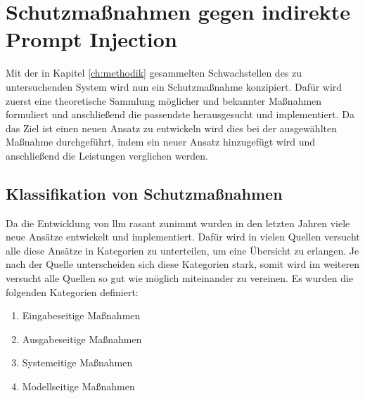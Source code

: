 \chapter{Schutzmaßnahmen gegen indirekte Prompt Injection}

Mit der in Kapitel \ref{ch:methodik} gesammelten Schwachstellen des zu untersuchenden System wird nun ein Schutzmaßnahme konzipiert. Dafür wird zuerst eine theoretische 
Sammlung möglicher und bekannter Maßnahmen formuliert und anschließend die passendste herausgesucht und implementiert. Da das Ziel ist einen neuen Ansatz zu entwickeln wird
dies bei der ausgewählten Maßnahme durchgeführt, indem ein neuer Ansatz hinzugefügt wird und anschließend die Leistungen verglichen werden.

\section{Klassifikation von Schutzmaßnahmen}

Da die Entwicklung von \ac{llm} rasant zunimmt wurden in den letzten Jahren viele neue Ansätze entwickelt und implementiert. Dafür wird in vielen Quellen versucht alle diese
Ansätze in Kategorien zu unterteilen, um eine Übersicht zu erlangen. Je nach der Quelle unterscheiden sich diese Kategorien stark, somit wird im weiteren versucht alle Quellen
so gut wie möglich miteinander zu vereinen. Es wurden die folgenden Kategorien definiert: \\

\begin{enumerate}
    \item Eingabeseitige Maßnahmen 
    \item Ausgabeseitige Maßnahmen
    \item Systemeitige Maßnahmen
    \item Modellseitige Maßnahmen
\end{enumerate}

